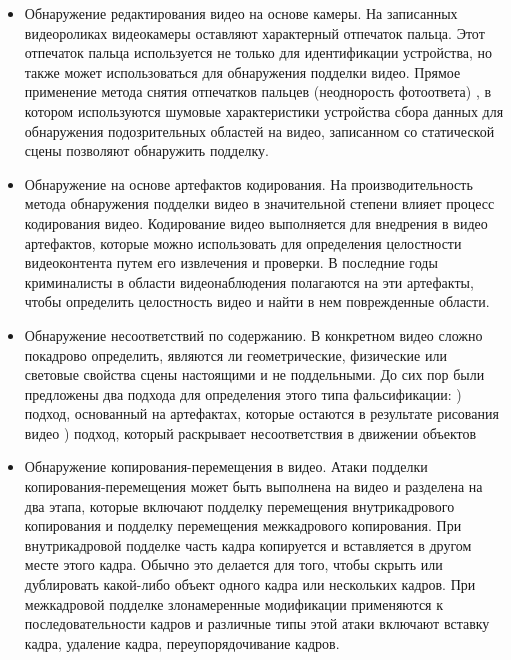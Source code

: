 \documentclass[12pt]{article}
\begin{document}
        \begin{itemize}
            \item Обнаружение редактирования видео на основе камеры.
            \newline На записанных видеороликах видеокамеры оставляют характерный отпечаток пальца. Этот отпечаток пальца используется не только для идентификации устройства, но также может использоваться для обнаружения подделки видео. Прямое применение метода снятия отпечатков пальцев (неоднорость фотоответа) , в котором используются шумовые характеристики устройства сбора данных для обнаружения подозрительных областей на видео, записанном со статической сцены позволяют обнаружить подделку.
            \item Обнаружение на основе артефактов кодирования. 
            \newline На производительность метода обнаружения подделки видео в значительной степени влияет процесс кодирования видео. Кодирование видео выполняется для внедрения в видео артефактов, которые можно использовать для определения целостности видеоконтента путем его извлечения и проверки. В последние годы криминалисты в области видеонаблюдения полагаются на эти артефакты, чтобы определить целостность видео и найти в нем поврежденные области.
            \item Обнаружение несоответствий по содержанию. 
            \newline В конкретном видео сложно покадрово определить, являются ли геометрические, физические или световые свойства сцены настоящими и не поддельными. До сих пор были предложены два подхода для определения этого типа фальсификации:
            ) подход, основанный на артефактах, которые остаются в результате рисования видео
            ) подход, который раскрывает несоответствия в движении объектов
            \item Обнаружение копирования-перемещения в видео.
            \newline Атаки подделки копирования-перемещения может быть выполнена на видео и разделена на два этапа, которые включают подделку перемещения внутрикадрового копирования и подделку перемещения межкадрового копирования. При внутрикадровой подделке часть кадра копируется и вставляется в другом месте этого кадра. Обычно это делается для того, чтобы скрыть или дублировать какой-либо объект одного кадра или нескольких кадров. При межкадровой подделке злонамеренные модификации применяются к последовательности кадров и различные типы этой атаки включают вставку кадра, удаление кадра, переупорядочивание кадров.
     \end{itemize}
\end{document}
